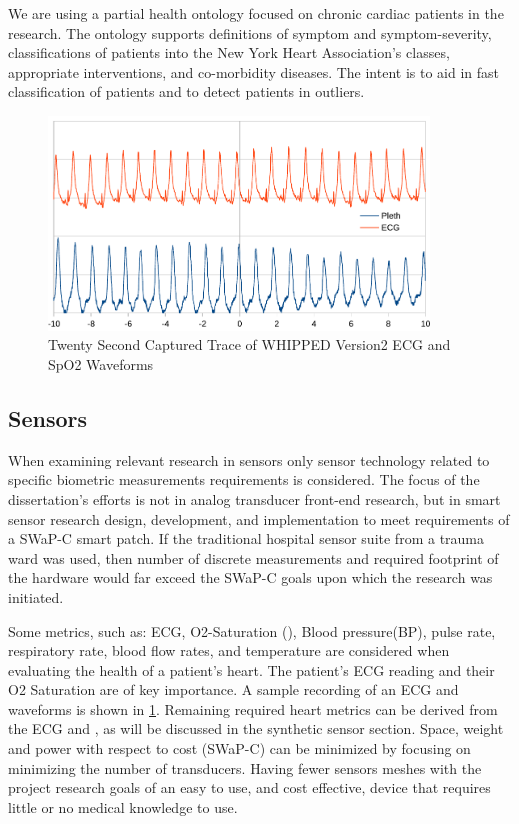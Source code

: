 We are using a partial health ontology focused on chronic cardiac patients in the research. The ontology supports definitions of symptom and symptom-severity, classifications of patients into the New York Heart Association's classes, appropriate interventions, and co-morbidity diseases. The intent is to aid in fast classification of patients and to detect patients in outliers.


\begin{figure}
	\begin{center}
		
		\includegraphics[scale=1,width=0.9\textwidth]{Images/20second.pdf} 
		\caption{Twenty Second Captured Trace of WHIPPED Version2 ECG and SpO2 Waveforms}
		\label{fig:20SecondEcg}
	\end{center}
\end{figure}


\subsection{Sensors}
\label{subsec:Sensors}
When examining relevant research in sensors only sensor technology related to specific biometric measurements requirements is considered. The focus of the dissertation's efforts is not in analog transducer front-end research, but in smart sensor research design, development, and implementation to meet requirements of a SWaP-C smart patch. If the traditional hospital sensor suite from a trauma ward was used, then number of discrete measurements and required footprint of the hardware would far exceed the SWaP-C goals upon which the research was initiated.

Some metrics, such as: ECG, O2-Saturation (), Blood pressure(BP), pulse rate, respiratory rate, blood flow rates, and temperature are considered when evaluating the health of a patient's heart. The patient's ECG reading and their O2 Saturation are of key importance. A sample recording of an ECG and  waveforms is shown in \cref{fig:20SecondEcg}. Remaining required heart metrics can be derived from the ECG and , as will be discussed in the synthetic sensor section. Space, weight and power with respect to cost (SWaP-C) can be minimized by focusing on minimizing the number of transducers. Having fewer sensors meshes with the project research goals of an easy to use, and cost effective, device that requires little or no medical knowledge to use.


